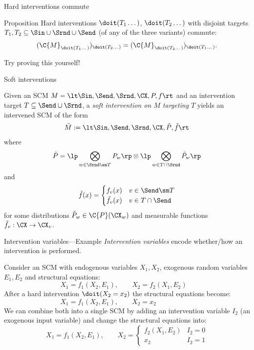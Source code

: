 \begin{frame}{Hard interventions commute}

\begin{block}{Proposition}
Hard interventions $\doit(T_1\dots)$, $\doit(T_2\dots)$ with disjoint targets $T_1, T_2 \subseteq \Sin \cup \Srnd \cup \Send$ (of any of the three variants) commute:
  $$(\C{M}_{\doit(T_1\dots)})_{\doit(T_2\dots)} = (\C{M}_{\doit(T_2\dots)})_{\doit(T_1\dots)}.$$
\end{block}
Try proving this yourself!
\end{frame}

\begin{frame}{Soft interventions}
\begin{Def}
  Given an SCM $M = \lt \Sin, \Send, \Srnd, \CX, P, f \rt$
  and an intervention target $T \subseteq \Send \cup \Srnd$, a \emph{soft intervention on $M$ targeting $T$}
  yields an intervened SCM of the form
  $$\tilde{M} := \lt \Sin,\Send,\Srnd,\CX,\tilde{P},\tilde{f} \rt$$
  where
  $$\tilde{P} = \lp\bigotimes_{w \in \Srnd \sm T} P_w \rp \otimes \lp \bigotimes_{w \in T \cap \Srnd} \tilde{P}_w \rp$$
  and
  $$\tilde{f}(x) = \begin{cases}
      f_v(x) & v \in \Send\sm T \\
      \tilde{f}_v(x) & v \in T \cap \Send \\
  \end{cases}$$
  for some distributions $\tilde{P}_w \in \C{P}(\CX_w)$ and measurable functions $\tilde{f}_v : \CX \to \CX_v$.
\end{Def}
\end{frame}

\begin{frame}{Intervention variables---Example}
  \emph{Intervention variables} encode whether/how an intervention is performed.
  \begin{example}
    Consider an SCM with endogenous variables $X_1,X_2$, exogenous random variables $E_1,E_2$ and structural equations:
    $$X_1 = f_1(X_2,E_1), \qquad
      X_2 = f_2(X_1,E_2) \phantom{x_2}$$
    After a hard intervention $\doit(X_2=x_2)$ the structural equations become:
    $$X_1 = f_1(X_2,E_1), \qquad
      X_2 = x_2 \phantom{f_2(X_1,E_2)}$$
    We can combine both into a single SCM by adding an intervention variable $I_2$ (an exogenous input variable) and change the structural equations into:
    $$X_1 = f_1(X_2,E_1), \qquad
      X_2 = \begin{cases}
        f_2(X_1,E_2) & I_2 = 0 \\
        x_2          & I_2 = 1
      \end{cases}$$
  \end{example}
\end{frame}

